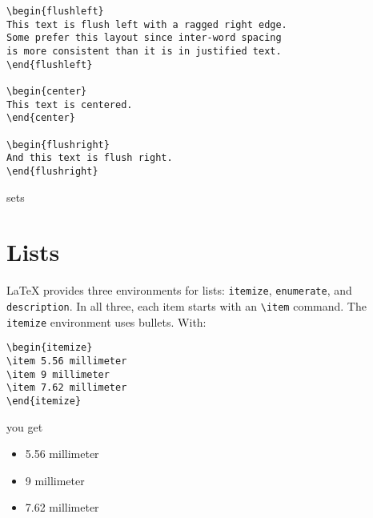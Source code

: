 \begin{leftfigure}
\begin{lstlisting}
\begin{flushleft}
This text is flush left with a ragged right edge.
Some prefer this layout since inter-word spacing
is more consistent than it is in justified text.
\end{flushleft}

\begin{center}
This text is centered.
\end{center}

\begin{flushright}
And this text is flush right.
\end{flushright}
\end{lstlisting}
\end{leftfigure}
sets
\begin{leftfigure}
\end{leftfigure}

\section{Lists}

\LaTeX{} provides three environments for lists:
\texttt{itemize}, \texttt{enumerate}, and \texttt{description}.
In all three, each item starts with an \verb|\item| command.
The \texttt{itemize} environment uses bullets.
With:
\begin{leftfigure}
\begin{lstlisting}
\begin{itemize}
\item 5.56 millimeter
\item 9 millimeter
\item 7.62 millimeter
\end{itemize}
\end{lstlisting}
\end{leftfigure}
you get
\begin{leftfigure}
\lm%
\begin{itemize}[leftmargin=*]
\item 5.56 millimeter
\item 9 millimeter
\item 7.62 millimeter
\end{itemize}
\end{leftfigure}


